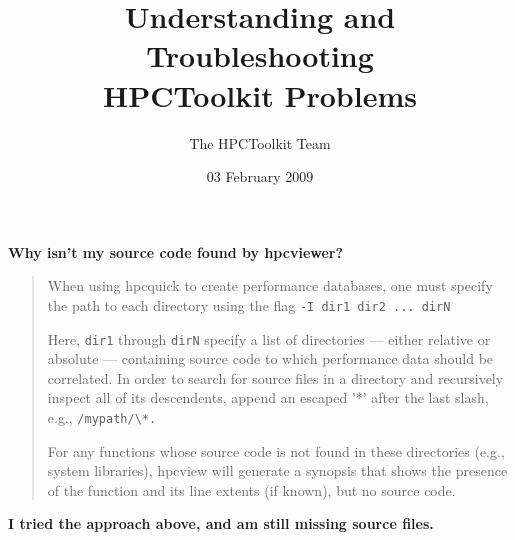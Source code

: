 \documentclass{article}
\begin{document}
\title{Understanding and Troubleshooting \\
         HPCToolkit Problems}
\author{The HPCToolkit Team}
\date{03 February 2009}
\maketitle
\textbf{Why isn't my source code found by hpcviewer?}
\begin{quote}
When using hpcquick to create performance databases, one must specify the path 
to each directory using the flag \verb|-I dir1 dir2 ... dirN|

Here, \verb|dir1| through \verb|dirN| specify a list of directories --– either
relative or absolute –-- containing source code to which performance
data should be correlated.  In order to search for source files in a
directory and recursively inspect all of its descendents, append an
escaped '*' after the last slash, e.g., \verb|/mypath/\*.|

For any functions whose source code is not found in these directories
(e.g., system libraries), hpcview will generate a synopsis that shows
the presence of the function and its line extents (if known), but no
source code.

\end{quote}
\textbf{I tried the approach above, and am still missing source files.}
\end{document}
